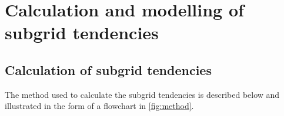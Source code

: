 \documentclass[../main.tex]{subfiles}
\begin{document}
\ifSubfilesClassLoaded{
    \frontmatter
    \tableofcontents
    \mainmatter
}{}

\chapter{Calculation and modelling of subgrid tendencies}
\label{chap:tendencies}
\setlength{\epigraphwidth}{.45\textwidth}



\section{Calculation of subgrid tendencies} \label{sec:calculation}
The method used to calculate the subgrid tendencies is described below and
illustrated in the form of a flowchart in \cref{fig:method}.
\end{document}
